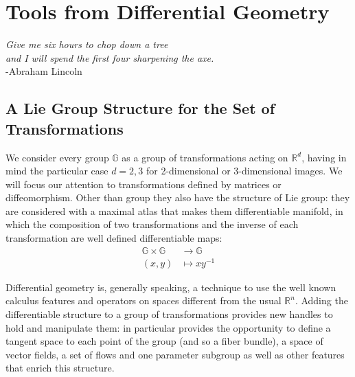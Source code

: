 \chapter{Tools from Differential Geometry}\label{ch:tools}

\begin{flushright}
\emph{Give me six hours to chop down a tree\\ and I will spend the first four sharpening the axe.}
\\ -Abraham Lincoln
\end{flushright}

\vspace{0.6cm}

\section{A Lie Group Structure for the Set of Transformations}\label{se:finite_lie_group}

We consider every group $\mathbb{G}$ as a group of transformations acting on $\mathbb{R}^{d}$, having in mind the particular case $d=2,3$ for 2-dimensional or 3-dimensional images.
We will focus our attention to transformations defined by matrices or diffeomorphism. Other than group they also have the structure of Lie group: they are considered with a maximal atlas that makes them differentiable manifold, in which the composition of two transformations and the inverse of each transformation are well defined differentiable maps:
\begin{align*}
\mathbb{G} \times \mathbb{G} & \longrightarrow  \mathbb{G}    \\
(x,y) &\longmapsto  x y^{-1}
\end{align*}

Differential geometry is, generally speaking, a technique to use the well known calculus features and operators on spaces different from the usual $\mathbb{R}^{n}$. Adding the differentiable structure to a group of transformations provides new handles to hold and manipulate them: in particular provides the opportunity to define a tangent space to each point of the group (and so a fiber bundle), a space of vector fields, a set of flows and one parameter subgroup as well as other features that enrich this structure.

